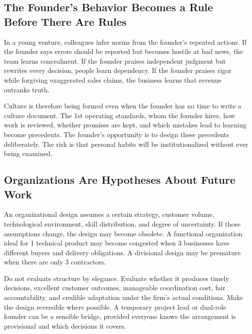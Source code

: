 \subsection{The Founder's Behavior Becomes a Rule Before There Are Rules}
\label{sec:founder_behavior_as_precedent}

In a young venture, colleagues infer norms from the founder's repeated actions. If the founder says errors should be reported but becomes hostile at bad news, the team learns concealment. If the founder praises independent judgment but rewrites every decision, people learn dependency. If the founder praises rigor while forgiving exaggerated sales claims, the business learns that revenue outranks truth.

Culture is therefore being formed even when the founder has no time to write a culture document. The 1st operating standards, whom the founder hires, how work is reviewed, whether promises are kept, and which mistakes lead to learning become precedents. The founder's opportunity is to design these precedents deliberately. The risk is that personal habits will be institutionalized without ever being examined.

\subsection{Organizations Are Hypotheses About Future Work}
\label{sec:orgs_hypotheses_future_work}

An organizational design assumes a certain strategy, customer volume, technological environment, skill distribution, and degree of uncertainty. If those assumptions change, the design may become obsolete. A functional organization ideal for 1 technical product may become congested when 3 businesses have different buyers and delivery obligations. A divisional design may be premature when there are only 3 contractors.

Do not evaluate structure by elegance. Evaluate whether it produces timely decisions, excellent customer outcomes, manageable coordination cost, fair accountability, and credible adaptation under the firm's actual conditions. Make the design reversible where possible. A temporary project lead or dual-role founder can be a sensible bridge, provided everyone knows the arrangement is provisional and which decisions it covers.

